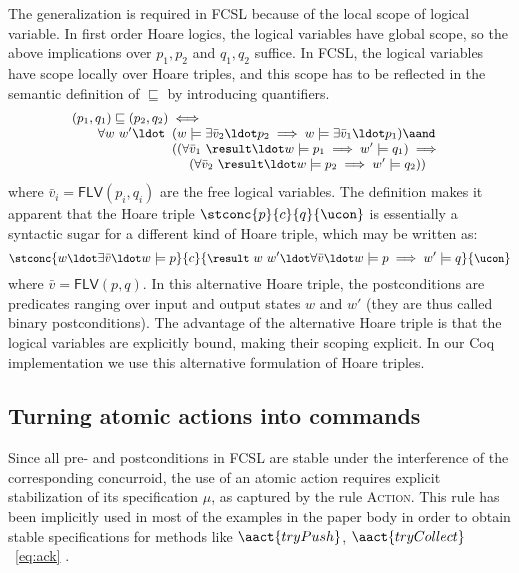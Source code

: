 The generalization is required in FCSL because of the local scope of
logical variable. In first order Hoare logics, the logical variables
have global scope, so the above implications over $p_1, p_2$ and $q_1,
q_2$ suffice. In FCSL, the logical variables have scope locally over
Hoare triples, and this scope has to be reflected in the semantic
definition of $\sqsubseteq$ by introducing quantifiers.
%
\[
{\small
\begin{array}{l}
(p_1, q_1) \sqsubseteq (p_2, q_2) \iff \hbox{}\\
\qquad \forall w\ w'\ldot \begin{array}[t]{l}
(w \models \exists \bar{v}_2\ldot p_2 \implies w \models \exists \bar{v}_1\ldot p_1) \aand \hbox{}\\
((\forall \bar{v}_1\ \result\ldot w \models p_1 \implies w' \models
q_1) \implies \\
~~~~(\forall \bar{v}_2\ \result\ldot w \models p_2 \implies w' \models q_2))
\end{array}
\end{array}
}\]
%
where $\bar{v}_i = \mathsf{FLV}(p_i, q_i)$ are the free logical
variables.
%
The definition makes it apparent that the Hoare triple
$\stconc{p}{c}{q}{\ucon}$ is essentially a syntactic sugar for a different
kind of Hoare triple, which may be written as:
%
\[
{\small
\stconc{w\ldot\exists \bar{v}\ldot w \models p}{c}{\result\ w\ w'\ldot \forall \bar{v}\ldot w \models p \implies w' \models q}{\ucon}
}\]
%
where $\bar{v} = \mathsf{FLV}(p,q)$. In this alternative Hoare triple,
the postconditions are predicates ranging over input and output states
$w$ and $w'$ (they are thus called binary postconditions). The
advantage of the alternative Hoare triple is that the logical
variables are explicitly bound, making their scoping explicit. In our
Coq implementation we use this alternative formulation of Hoare
triples.


\subsection{Turning atomic actions into commands}
\label{sec:stable-spec-atom}
%
Since all pre- and postconditions in FCSL are stable under the
interference of the corresponding concurroid, the use of an atomic
action requires explicit stabilization of its specification $\mu$, as
captured by the rule \textsc{Action}. This rule has been implicitly
used in most of the examples in the paper body in order to obtain
stable specifications for methods like $\aact{tryPush}$,
$\aact{tryCollect}$~\eqref{eq:ack} \etc.
%

